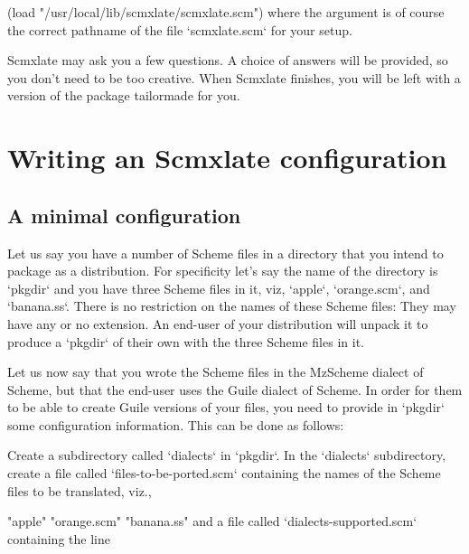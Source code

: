 \begintts
(load "/usr/local/lib/scmxlate/scmxlate.scm")
\endtt
where the  argument is of course the correct
pathname of the file `scmxlate.scm` for your
setup.

Scmxlate may ask you a few questions.  A
choice of answers will be provided, so you don’t need
to be too creative.  When Scmxlate finishes, you
will be left with a version of the package tailormade
for you.

\section{Writing an Scmxlate configuration}
\label{writeconfig}

%

\subsection{A minimal configuration}

Let us say you have a number of Scheme files in
a directory that you intend to package as a
distribution.  For specificity let’s say the name of the
directory is `pkgdir` and you have three Scheme files in it,
viz, `apple`, `orange.scm`, and `banana.ss`.
There is no restriction on the names of these Scheme
files: They may have any or no extension.  An end-user
of your distribution will unpack it to produce a
`pkgdir` of their own with the three Scheme files in
it.

Let us now say that you wrote the Scheme files in the
MzScheme dialect of Scheme, but that the end-user
uses the Guile dialect of Scheme.  In order for them to
be able to create Guile versions of your files, you
need to provide in `pkgdir` some configuration
information.  This can be done as follows:

Create a subdirectory called `dialects` in
`pkgdir`.  In the `dialects` subdirectory,
create a file called `files-to-be-ported.scm`
containing the names of the Scheme files to be
translated,  viz.,

\begintts
"apple"
"orange.scm"
"banana.ss"
\endtt
and a file called `dialects-supported.scm` containing
the line

